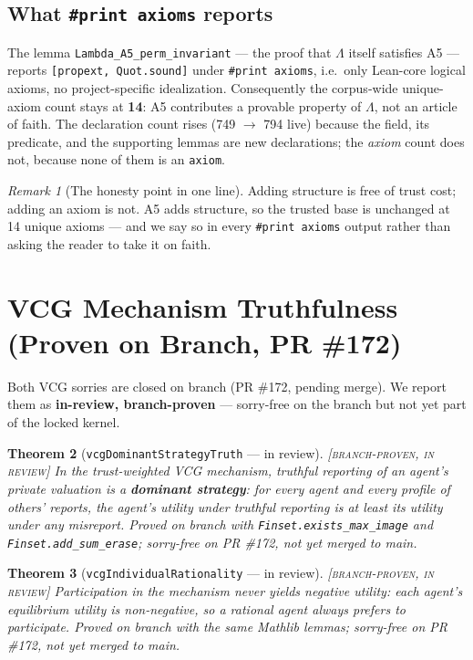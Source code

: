 \documentclass[11pt]{article}
\theoremstyle{plain}
\newtheorem{theorem}{Theorem}[section]
\theoremstyle{definition}
\theoremstyle{remark}
\newtheorem{remark}[theorem]{Remark}
\newcommand{\statusBranch}{\textcolor{szlorange}{\textsc{[branch-proven, in review]}}}
\newcommand{\La}{\Lambda}
\begin{document}
\subsection{What \texttt{\#print axioms} reports}
The lemma \texttt{Lambda\_A5\_perm\_invariant} --- the proof that $\La$ itself
satisfies A5 --- reports \texttt{[propext, Quot.sound]} under \texttt{\#print
axioms}, i.e.\ only Lean-core logical axioms, no project-specific idealization.
Consequently the corpus-wide unique-axiom count stays at \textbf{14}: A5 contributes
a provable property of $\La$, not an article of faith. The declaration count rises
(749 $\to$ 794 live) because the field, its predicate, and the supporting lemmas are
new declarations; the \emph{axiom} count does not, because none of them is an
\texttt{axiom}.

\begin{remark}[The honesty point in one line]
Adding structure is free of trust cost; adding an axiom is not. A5 adds structure, so
the trusted base is unchanged at 14 unique axioms --- and we say so in every
\texttt{\#print axioms} output rather than asking the reader to take it on faith.
\end{remark}

\section{VCG Mechanism Truthfulness (Proven on Branch, PR \#172)}

Both VCG sorries are closed on branch (PR \#172, pending merge). We report them as
\textbf{in-review, branch-proven} --- sorry-free on the branch but not yet part of
the locked kernel.

\begin{theorem}[\texttt{vcgDominantStrategyTruth} --- in review] \statusBranch
In the trust-weighted VCG mechanism, truthful reporting of an agent's private
valuation is a \textbf{dominant strategy}: for every agent and every profile of
others' reports, the agent's utility under truthful reporting is at least its utility
under any misreport. Proved on branch with \texttt{Finset.exists\_max\_image} and
\texttt{Finset.add\_sum\_erase}; sorry-free on PR \#172, not yet merged to main.
\end{theorem}

\begin{theorem}[\texttt{vcgIndividualRationality} --- in review] \statusBranch
Participation in the mechanism never yields negative utility: each agent's
equilibrium utility is non-negative, so a rational agent always prefers to
participate. Proved on branch with the same Mathlib lemmas; sorry-free on PR \#172,
not yet merged to main.
\end{theorem}
\end{document}
